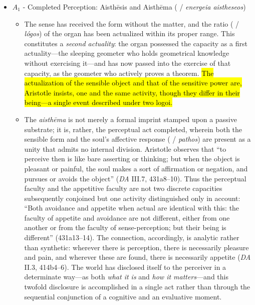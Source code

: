 \begin{itemize}
    \item $A_1$ - Completed Perception: Aisthēsis and Aisthēma ( / \textit{energeia aistheseos})
    \begin{itemize}
        \item The sense has received the form without the matter, and the ratio ( / \textit{lógos}) of the organ has been actualized within its proper range. This constitutes a \textit{second actuality}: the organ possessed the capacity as a first actuality---the sleeping geometer who holds geometrical knowledge without exercising it---and has now passed into the exercise of that capacity, as the geometer who actively proves a theorem. \hl{The actualization of the sensible object and that of the sensitive power are, Aristotle insists, one and the same activity, though they differ in their being---a single event described under two logoi.}
        \item The \textit{aisthēma} is not merely a formal imprint stamped upon a passive substrate; it is, rather, the perceptual act completed, wherein both the sensible form and the soul's affective response ( / \textit{pathos}) are present as a unity that admits no internal division. Aristotle observes that ``to perceive then is like bare asserting or thinking; but when the object is pleasant or painful, the soul makes a sort of affirmation or negation, and pursues or avoids the object'' (\textit{DA} III.7, 431a8--10). Thus the perceptual faculty and the appetitive faculty are not two discrete capacities subsequently conjoined but one activity distinguished only in account: ``Both avoidance and appetite when actual are identical with this: the faculty of appetite and avoidance are not different, either from one another or from the faculty of sense-perception; but their being is different'' (431a13--14). The connection, accordingly, is analytic rather than synthetic: wherever there is perception, there is necessarily pleasure and pain, and wherever these are found, there is necessarily appetite (\textit{DA} II.3, 414b4--6). The world has disclosed itself to the perceiver in a determinate way---as both \textit{what it is} and \textit{how it matters}---and this twofold disclosure is accomplished in a single act rather than through the sequential conjunction of a cognitive and an evaluative moment.

\end{itemize}
\end{itemize}
